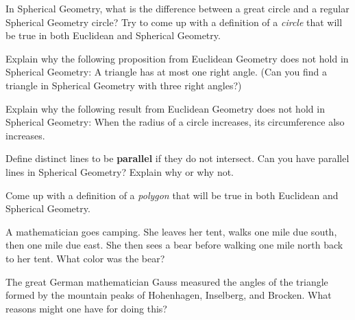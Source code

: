 \begin{prob}
In Spherical Geometry, what is the difference between a great circle
and a regular Spherical Geometry circle?  Try to come up with a
definition of a \textit{circle} that will be true in both Euclidean
and Spherical Geometry.
\end{prob}

\begin{prob} Explain why the following proposition from Euclidean Geometry
  does not hold in Spherical Geometry: A triangle has at most one
  right angle.  (Can you find a triangle in Spherical Geometry with
  three right angles?)
\end{prob}

\begin{prob}
Explain why the following result from Euclidean Geometry does not hold
in Spherical Geometry: When the radius of a circle increases, its
circumference also increases.
\end{prob}

\begin{prob}
Define distinct lines to be \textbf{parallel} if they do not
intersect. Can you have parallel lines in Spherical Geometry?  Explain
why or why not.
\end{prob}


\begin{prob}
Come up with a definition of a \textit{polygon} that will be
true in both Euclidean and Spherical Geometry.
\end{prob}


\begin{prob}
A mathematician goes camping. She leaves her tent, walks one mile due
south, then one mile due east. She then sees a bear before walking one
mile north back to her tent. What color was the bear?
\end{prob}

\begin{prob}
The great German mathematician Gauss measured the angles of the
  triangle formed by the mountain peaks of Hohenhagen, Inselberg, and
  Brocken. What reasons might one have for doing this?
\end{prob}
